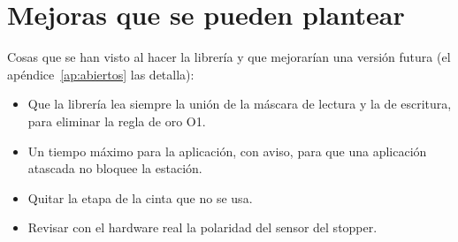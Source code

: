 \section{Mejoras que se pueden plantear}
Cosas que se han visto al hacer la librería y que mejorarían una versión futura (el apéndice~\ref{ap:abiertos} las detalla):
\begin{itemize}
\item Que la librería lea siempre la unión de la máscara de lectura y la de escritura, para eliminar la regla de oro O1.
\item Un tiempo máximo para la aplicación, con aviso, para que una aplicación atascada no bloquee la estación.
\item Quitar la etapa de la cinta que no se usa.
\item Revisar con el hardware real la polaridad del sensor del stopper.
\end{itemize}
